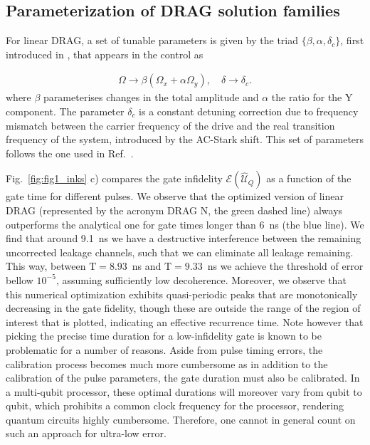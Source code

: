 \documentclass[superscriptaddress,amsmath,amssymb,aps,twocolumn,praplied,notitlepage]{revtex4-2}
\begin{document}
\subsection{Parameterization of DRAG solution families} \label{drag_num}

For linear DRAG, a set of tunable parameters is given by the triad $\{\beta, \alpha, \delta_{c}\}$, first introduced in \cite{PhysRevA.83.012308}, that appears in the control as

\begin{eqnarray}
\Omega \rightarrow \beta (\Omega_x+\alpha \Omega_y),\quad \delta \rightarrow \delta_c.
\label{eq:num_drag}
\end{eqnarray}
where $\beta$ parameterises changes in the total amplitude and $\alpha$ the ratio for the Y component. The parameter $\delta_{c}$ is a constant detuning correction due to frequency mismatch between the carrier frequency of the drive and the real transition frequency of the system, introduced by the AC-Stark shift. This set of parameters follows the one used in Ref.~\cite{PhysRevLett.116.020501}.

Fig.~\ref{fig:fig1_inks} c) compares the gate infidelity $\mathcal{E}(\hat{\mathcal{U}}_Q)$ as a function of the gate time for different pulses. We observe that the optimized version of linear DRAG { (represented by the acronym DRAG N, the green dashed line)} always outperforms the analytical one for gate times longer than 6~ns {(the blue line)}. We find that around 9.1~ns we have a destructive interference between the remaining uncorrected leakage channels, such that we can eliminate all leakage remaining. This way,  between $\text{T}=8.93$~ns and $\text{T}=9.33$~ns  we achieve the threshold of error bellow $10^{-5}$, assuming sufficiently low decoherence. Moreover, we observe that this numerical optimization exhibits quasi-periodic peaks that are monotonically decreasing in the gate fidelity, though these are outside the range of the region of interest that is plotted, indicating an effective recurrence time. Note however that picking the precise time duration for a low-infidelity gate is known \cite{Warrenmagnus} to be problematic for a number of reasons. Aside from pulse timing errors, the calibration process becomes much more cumbersome as in addition to the calibration of the pulse parameters, the gate duration must also be calibrated. In a multi-qubit processor, these optimal durations will moreover vary from qubit to qubit, which prohibits a common clock frequency for the processor, rendering quantum circuits highly cumbersome. Therefore, one cannot in general count on such an approach for ultra-low error.
\end{document}
